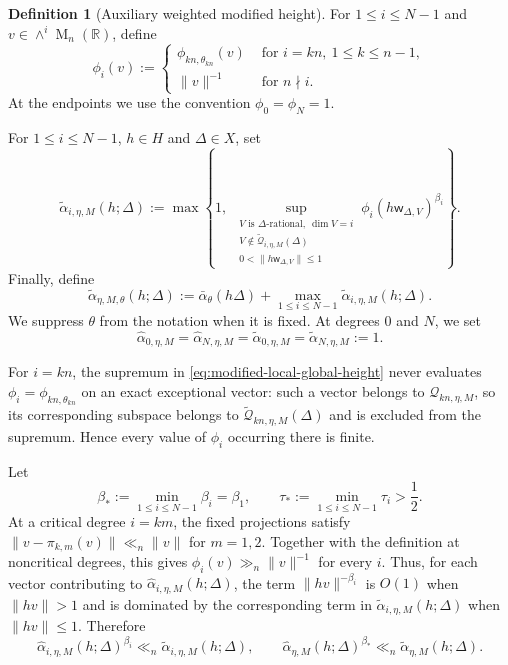 \documentclass[reqno,11pt]{amsart}
\numberwithin{equation}{section}
\theoremstyle{definition}
\newtheorem{definition}[theorem]{Definition}
\theoremstyle{remark}
\newcommand{\op}{\operatorname}
\newcommand{\br}{\mathbb R}
\newcommand{\M}{\op{M}}
\begin{document}
\begin{definition}[Auxiliary weighted modified height]
\label{def:auxiliary-weighted-modified-height}
For $1\le i\le N-1$ and $v\in \wedge^i \M_n(\br)$, define
$$
\phi_i(v):=
\begin{cases}
\phi_{kn,\theta_{kn}}(v)&\text{ for } i=kn,\ 1\le k\le n-1,\\ 
\|v\|^{-1} &\text{ for } n\nmid i.
\end{cases}
$$
At the endpoints we use the convention
$\phi_0=\phi_N=1$.

For $1\le i\le N-1$, $h\in H$ and $\Delta\in X$, set
\begin{equation}\label{eq:modified-local-global-height}
\widetilde\alpha_{i,\eta,M}(h;\Delta)
:=
\max\left\{
1,\
\sup_{\substack{
V\text{ is $\Delta$-rational},\ \dim V=i\\
V\notin\widetilde{\mathscr Q}_{i,\eta,M}(\Delta)\\
0<\|h\mathsf w_{\Delta,V}\|\le1}}
\phi_i(h\mathsf w_{\Delta,V})^{\beta_i}
\right\}.
\end{equation}
Finally, define
\begin{equation}\label{eq:modified-global-height}
\widetilde\alpha_{\eta,M,\theta}(h;\Delta)
:=
\bar\alpha_\theta(h\Delta)
+
\max_{1\le i\le N-1}
\widetilde\alpha_{i,\eta,M}(h;\Delta).
\end{equation}
We suppress $\theta$ from the notation when it is fixed. At degrees
$0$ and $N$, we set
$$
\widehat\alpha_{0,\eta,M}
=\widehat\alpha_{N,\eta,M}
=
\widetilde\alpha_{0,\eta,M}
=\widetilde\alpha_{N,\eta,M}
:=1.
$$
\end{definition}

For $i=kn$, the supremum in
\eqref{eq:modified-local-global-height} never evaluates
$\phi_i=\phi_{kn,\theta_{kn}}$ on an exact exceptional vector: such a
vector belongs to $\mathscr Q_{kn,\eta,M}$, so its corresponding
subspace belongs to
$\widetilde{\mathscr Q}_{kn,\eta,M}(\Delta)$ and is excluded from the
supremum. Hence every value of $\phi_i$ occurring there is finite.



Let
$$
\beta_*:=\min_{1\le i\le N-1}\beta_i=\beta_1,
\qquad
\tau_*:=\min_{1\le i\le N-1}\tau_i>\frac12.
$$
At a critical degree $i=km$,
the fixed projections satisfy $\|v-\pi_{k,m}(v)\|\ll_n\|v\|$ for $m=1,2$. Together with the definition at noncritical degrees, this gives
$\phi_i(v)\gg_n\|v\|^{-1}$ for every $i$. Thus, for each vector contributing to $\widehat{\alpha}_{i,\eta,M}(h;\Delta)$, the term
$\|hv\|^{-\beta_i}$ is $O(1)$ when $\|hv\|>1$ and is dominated by the
corresponding term in $\widetilde\alpha_{i,\eta,M}(h;\Delta)$ when
$\|hv\|\le1$. Therefore
\begin{equation}\label{eq:sharp-majorized-by-tilde}
\widehat{\alpha}_{i,\eta,M}(h;\Delta)^{\beta_i}
\ll_n \widetilde\alpha_{i,\eta,M}(h;\Delta),
\qquad
\widehat{\alpha}_{\eta,M}(h;\Delta)^{\beta_*}
\ll_n \widetilde\alpha_{\eta,M}(h;\Delta).
\end{equation}
\end{document}
